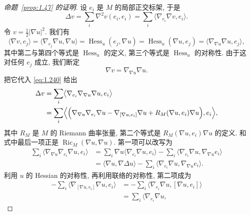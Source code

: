 \begin{proof}[命题~\ref{prop:1.47} 的证明]
设 $e_i$ 是 $M$ 的局部正交标架, 于是
\begin{equation}
\Delta v=\sum_i\nabla^{2}v(e_i,e_i)
 =\sum_i\langle\nabla_{e_i}\nabla v,e_i\rangle.
\label{eq:1.240}
\end{equation}
令 $v=\frac12|\nabla u|^{2}$. 我们有
\[
\langle\nabla v,e_j\rangle
 =\bigl\langle\nabla_{e_j}\nabla u,\nabla u\bigr\rangle
 =\operatorname{Hess}_u(e_j,\nabla u)
 =\operatorname{Hess}_u(\nabla u,e_j)
 =\bigl\langle\nabla_{\nabla u}\nabla u,e_j\bigr\rangle,
\]
其中第二与第四个等式是 $\operatorname{Hess}_u$ 的定义, 第三个等式是
$\operatorname{Hess}_u$ 的对称性. 由于这对任何 $e_j$ 成立, 我们断定
\begin{equation}
\nabla v=\nabla_{\nabla u}\nabla u.
\label{eq:1.241}
\end{equation}
把它代入 \eqref{eq:1.240} 给出
\begin{equation}
\begin{aligned}
\Delta v&=\sum_i
 \bigl\langle\nabla_{e_i}\nabla_{\nabla u}\nabla u,e_i\bigr\rangle\\
&=\sum_i\Bigl\langle\Bigl(\nabla_{\nabla u}\nabla_{e_i}\nabla u
 -\nabla_{[\nabla u,e_i]}\nabla u
 +R_M(\nabla u,e_i)\nabla u\Bigr),e_i\Bigr\rangle,
\end{aligned}
\label{eq:1.242}
\end{equation}
其中 $R_M$ 是 $M$ 的 Riemann 曲率张量, 第二个等式是
$R_M(\nabla u,e_i)\nabla u$ 的定义. 和式中最后一项正是
$\operatorname{Ric}_M(\nabla u,\nabla u)$. 第一项可以改写为
\begin{equation}
\begin{aligned}
\sum_i\bigl\langle\nabla_{\nabla u}\nabla_{e_i}\nabla u,e_i\bigr\rangle
&=\sum_i\nabla u\bigl\langle\nabla_{e_i}\nabla u,e_i\bigr\rangle
 -\sum_i\bigl\langle\nabla_{e_i}\nabla u,\nabla_{\nabla u}e_i\bigr\rangle\\
&=\langle\nabla u,\nabla\Delta u\rangle
 -\sum_i\bigl\langle\nabla_{e_i}\nabla u,\nabla_{\nabla u}e_i\bigr\rangle.
\end{aligned}
\label{eq:1.243}
\end{equation}
利用 $u$ 的 Hessian 的对称性, 再利用联络的对称性, 第二项成为
\begin{equation}
\begin{aligned}
-\sum_i\bigl\langle\nabla_{[\nabla u,e_i]}\nabla u,e_i\bigr\rangle
&=-\sum_i\bigl\langle\nabla_{e_i}\nabla u,[\nabla u,e_i]\bigr\rangle\\
&=\sum_i\bigl\langle\nabla_{e_i}\nabla u,

\end{aligned}
\end{equation}
\end{proof}
